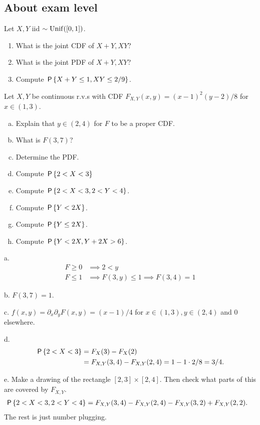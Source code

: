 \documentclass[assignments]{subfiles}
\begin{document}
\subsection{About exam level}
\label{sec:chapter-8}

\begin{exercise}
Let $X, Y$ iid $\sim \Unif{[0,1]}$.
\begin{enumerate}
\item What is the joint CDF of $X+Y, XY$?
\item What is the joint PDF of $X+Y, XY$?
\item Compute $\P{X+Y\leq 1, XY\leq 2/9}$.
\end{enumerate}
\end{exercise}

\begin{exercise}
Let $X, Y$ be continuous r.v.s with CDF $F_{X,Y}(x,y) = (x-1)^{2}(y-2)/8$ for $x \in (1, 3)$.
\begin{enumerate}[a.]
\item Explain that $y\in (2,4)$ for  $F$ to be a proper CDF.
\item What is $F(3,7)$?
\item Determine the PDF.
\item Compute $\P{2< X < 3}$
\item Compute $\P{2< X < 3, 2<Y<4}$.
\item Compute $\P{Y< 2X}$.
\item Compute $\P{Y\leq  2X}$.
\item Compute $\P{Y< 2X, Y+2X > 6}$.
\end{enumerate}
\begin{solution}
a.
\begin{align}
\label{eq:11}
F \geq 0 &\implies 2<y\\
F \leq 1 &\implies F(3, y)\leq 1 \implies F(3,4)=1
\end{align}

b. $F(3,7) = 1$.

c. $f(x,y) = \partial_{x} \partial_{y} F(x,y) = (x-1)/4$ for $x\in(1,3), y\in(2,4)$ and $0$ elsewhere.

d.
\begin{align}
  \label{}
\P{2 < X < 3}
&= F_{X}(3) - F_{X}(2) \\
&= F_{X,Y}(3, 4) - F_{X,Y}(2,4) = 1 - 1\cdot 2/8 = 3/4.
\end{align}

e.
Make a drawing of the rectangle $[2,3]\times[2,4]$. Then check what parts of this are covered by $F_{X,Y}$.
\begin{align}
  \label{}
\P{2 < X < 3, 2 < Y < 4}
&= F_{X,Y}(3, 4) - F_{X,Y}(2,4)  - F_{X,Y}(3, 2) + F_{X,Y}(2,2).
\end{align}
The rest is just number plugging.


\end{solution}
\end{exercise}
\end{document}
